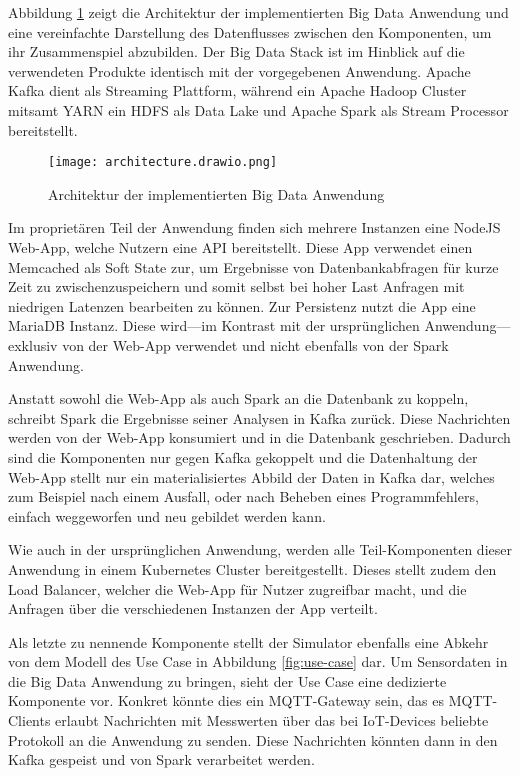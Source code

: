 Abbildung \ref{fig:architektur} zeigt die Architektur der implementierten Big Data Anwendung und eine vereinfachte Darstellung des Datenflusses zwischen den Komponenten, um ihr Zusammenspiel abzubilden.
Der Big Data Stack ist im Hinblick auf die verwendeten Produkte identisch mit der vorgegebenen Anwendung.
Apache Kafka dient als Streaming Plattform, während ein Apache Hadoop Cluster mitsamt YARN ein HDFS als Data Lake und Apache Spark als Stream Processor bereitstellt.

\begin{figure}[H]
  \centering
  \texttt{[image: architecture.drawio.png]}
  \caption{Architektur der implementierten Big Data Anwendung}\label{fig:architektur}
\end{figure}

Im proprietären Teil der Anwendung finden sich mehrere Instanzen eine NodeJS Web-App, welche Nutzern eine API bereitstellt.
Diese App verwendet einen Memcached als Soft State zur, um Ergebnisse von Datenbankabfragen für kurze Zeit zu zwischenzuspeichern und somit selbst bei hoher Last Anfragen mit niedrigen Latenzen bearbeiten zu können.
Zur Persistenz nutzt die App eine MariaDB Instanz.
Diese wird---im Kontrast mit der ursprünglichen Anwendung---exklusiv von der Web-App verwendet und nicht ebenfalls von der Spark Anwendung.

Anstatt sowohl die Web-App als auch Spark an die Datenbank zu koppeln, schreibt Spark die Ergebnisse seiner Analysen in Kafka zurück.
Diese Nachrichten werden von der Web-App konsumiert und in die Datenbank geschrieben.
Dadurch sind die Komponenten nur gegen Kafka gekoppelt und die Datenhaltung der Web-App stellt nur ein materialisiertes Abbild der Daten in Kafka dar, welches zum Beispiel nach einem Ausfall, oder nach Beheben eines Programmfehlers, einfach weggeworfen und neu gebildet werden kann.

Wie auch in der ursprünglichen Anwendung, werden alle Teil-Komponenten dieser Anwendung in einem Kubernetes Cluster bereitgestellt.
Dieses stellt zudem den Load Balancer, welcher die Web-App für Nutzer zugreifbar macht, und die Anfragen über die verschiedenen Instanzen der App verteilt.

Als letzte zu nennende Komponente stellt der Simulator ebenfalls eine Abkehr von dem Modell des Use Case in Abbildung \ref{fig:use-case} dar.
Um Sensordaten in die Big Data Anwendung zu bringen, sieht der Use Case eine dedizierte Komponente vor.
Konkret könnte dies ein MQTT-Gateway sein, das es MQTT-Clients erlaubt Nachrichten mit Messwerten über das bei IoT-Devices beliebte Protokoll an die Anwendung zu senden.
Diese Nachrichten könnten dann in den Kafka gespeist und von Spark verarbeitet werden.

